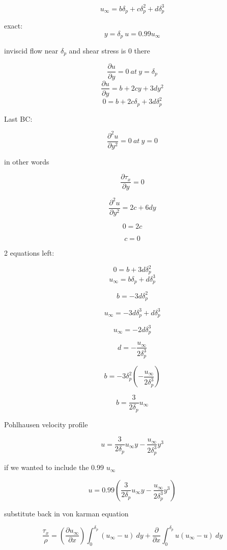 \documentclass[11pt]{article}
\begin{document}
\begin{equation}
u_\infty = b \delta_p + c \delta_p^2 + d \delta_p^3
\end{equation}

exact:
$$y = \delta_p \  u = 0.99 u_\infty$$


inviscid flow near $\delta_p$ and shear stress is 0 there

$$\frac{\partial u}{\partial y} = 0 \ at \ y = \delta_p$$
$$\frac{\partial u}{\partial y} = b + 2c y + 3d y^2$$
\begin{equation}
0 = b + 2c \delta_p + 3d \delta_p^2
\end{equation}

Last BC:

$$\frac{\partial^2 u}{\partial y^2} = 0 \ at \ y = 0$$

in other words

$$\frac{ \partial \tau_x}{\partial y}= 0$$

$$\frac{\partial^2 u}{\partial y^2} = 2c + 6d y$$

$$0 = 2c $$

$$c=0$$

2 equations left:

$$0 = b + 3d \delta_p^2$$
$$u_\infty = b \delta_p + d \delta_p^3$$

$$b = -3d \delta_p^2$$


$$u_\infty = -3 d\delta_p^3 + d \delta_p^3$$

$$u_\infty = -2d\delta_p^3 $$

\begin{equation}
d= - \frac{u_\infty}{2\delta_p^3}
\end{equation}

$$b= -3 \delta_p^2 (- \frac{u_\infty}{2\delta_p^3}) $$

\begin{equation}
b = \frac{3}{2 \delta_p} u_\infty
\end{equation}

Pohlhausen velocity profile

$$u = \frac{3}{2 \delta_p} u_\infty y  - \frac{u_\infty}{2\delta_p^3} y^3  $$

if we wanted to include the 0.99 $u_\infty$

$$u = 0.99 (\frac{3}{2 \delta_p} u_\infty y  - \frac{u_\infty}{2\delta_p^3} y^3 ) $$

substitute back in von karman equation

$$ \frac{\tau_x}{\rho} = ( \frac{\partial u_\infty}{\partial x}) \int_0^{\delta_p} ( u_\infty - u ) \ dy  + \frac{\partial}{\partial x}   \int_0^{\delta_p} u( u_\infty - u) \ dy $$
\end{document}
